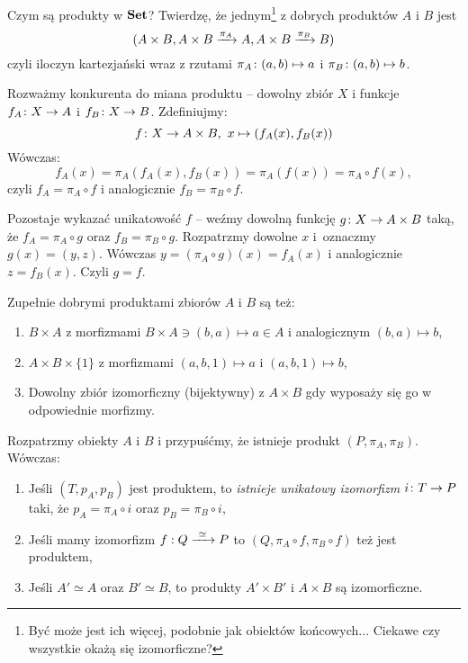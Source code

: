 \begin{exmp}
	Czym są produkty w $\Set$? Twierdzę, że jednym\footnote{Być może jest ich więcej, podobnie jak obiektów końcowych... Ciekawe czy wszystkie okażą się izomorficzne?} z dobrych produktów $A$ i $B$ jest $$(A\times B, \morpharr{\pi_A}{A\times B}A, \morpharr{\pi_B}{A\times B}B)$$
  czyli iloczyn kartezjański wraz z rzutami $\actsas{\pi_A}{(a, b)}a$ i $\actsas{\pi_B}{(a, b)}b$.

  Rozważmy konkurenta do miana produktu -- dowolny zbiór $X$ i funkcje $\morph {f_A}XA$ i $\morph {f_B}XB$. Zdefiniujmy:
  $$\morph f X {A\times B},~x \mapsto {(f_A(x), f_B(x))}$$
  Wówczas:
	$$f_A(x) = \pi_A(f_A(x), f_B(x)) = \pi_A(f(x)) = \pi_A\circ f(x),$$
	czyli $f_A = \pi_A\circ f$ i analogicznie $f_B = \pi_B\circ f$.

  Pozostaje wykazać unikatowość $f$ -- weźmy dowolną funkcję $\morph gX{A\times B}$ taką, że $f_A = \pi_A\circ g$ oraz $f_B = \pi_B \circ g$.
  Rozpatrzmy dowolne $x$ i~oznaczmy $g(x) = (y, z)$. Wówczas $y = (\pi_A\circ g)(x) = f_A(x)$ i analogicznie $z=f_B(x)$. Czyli $g=f$.
\end{exmp}

\begin{remk}
  Zupełnie dobrymi produktami zbiorów $A$ i $B$ są też:
  \begin{enumerate}
    \item $B\times A$ z morfizmami $B\times A \ni (b, a)\mapsto a\in A$ i analogicznym $(b, a)\mapsto b$,
    \item $A\times B\times \{1\}$ z morfizmami $(a, b, 1)\mapsto a$ i $(a, b, 1)\mapsto b$,
    \item Dowolny zbiór izomorficzny (bijektywny) z $A\times B$ gdy wyposaży się go w odpowiednie morfizmy.
  \end{enumerate}
\end{remk}

\begin{thm}
  \label{thm:uniqueprod}
  Rozpatrzmy obiekty $A$ i $B$ i przypuśćmy, że istnieje produkt $(P, \pi_A, \pi_B)$. Wówczas:
  \begin{enumerate}
    \item Jeśli $(T, p_A, p_B)$ jest produktem, to \emph{istnieje unikatowy izomorfizm} $\morph iTP$ taki, że $p_A = \pi_A\circ i$ oraz $p_B = \pi_B\circ i$,
    \item Jeśli mamy izomorfizm $\isomorph fQP$ to $(Q, \pi_A \circ f, \pi_B\circ f)$ też jest produktem,
    \item Jeśli $A'\simeq A$ oraz $B'\simeq B$, to produkty $A' \times B'$ i $A\times B$ są izomorficzne.
  \end{enumerate}
\end{thm}

